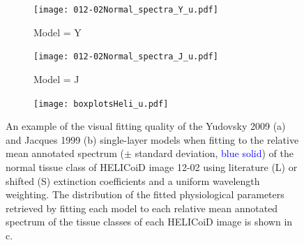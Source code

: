 \begin{subappendices}
\begin{figure}[h!]
    \centering
    \begin{subfigure}{0.49\textwidth}
        \texttt{[image: 012-02Normal\_spectra\_Y\_u.pdf]}
        \caption{Model = Y}
        \label{fig:backwardsHSIHeliYuniform}
    \end{subfigure}
    \begin{subfigure}{0.49\textwidth}
        \texttt{[image: 012-02Normal\_spectra\_J\_u.pdf]}
        \caption{Model = J}
        \label{fig:backwardsHSIHeliJuniform}
    \end{subfigure}
    \begin{subfigure}{\textwidth}
        \texttt{[image: boxplotsHeli\_u.pdf]}
        \caption{}
        \label{fig:boxplotsHeliuniform}
    \end{subfigure}
    \caption{An example of the visual fitting quality of the Yudovsky 2009 (a) and Jacques 1999 (b) single-layer models when fitting to the relative mean annotated spectrum ($\pm$ standard deviation, \textcolor{blue}{blue solid}) of the normal tissue class of HELICoiD image 12-02 using literature (L) or shifted (S) extinction coefficients and a uniform wavelength weighting. The distribution of the fitted physiological parameters retrieved by fitting each model to each relative mean annotated spectrum of the tissue classes of each HELICoiD image is shown in c.}
    \label{fig:HELICoiDannuniform}
\end{figure}
\FloatBarrier
\end{subappendices}
